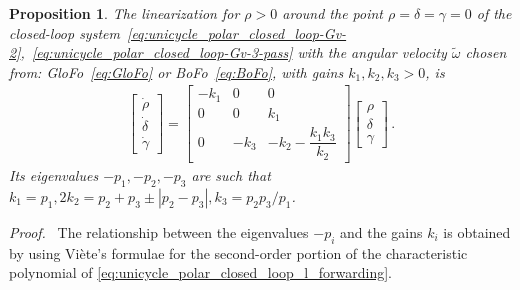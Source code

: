 \documentclass[journal,twoside,web]{ieeecolor}
\theoremstyle{definition}
\newtheorem{proposition}{Proposition}
\newcommand{\abs}[1]{\left\lvert#1\right\rvert}
\renewenvironment{proof}[1][Proof]{\par\pushQED{\qed}\normalfont\textit{#1.}~}{\popQED\par}
\begin{document}
\begin{proposition}\em 
\label{prop:linearization_CLF_forwarding_based}
The linearization for $\rho>0$ around the point $\rho =\delta = \gamma = 0$ of the closed-loop system~\eqref{eq:unicycle_polar_closed_loop-Gv-2},~\eqref{eq:unicycle_polar_closed_loop-Gv-3-pass} with the angular velocity \(\tilde{\omega}\)  chosen from: GloFo~\eqref{eq:GloFo} or BoFo~\eqref{eq:BoFo},
with gains $k_1, k_2, k_3 > 0$, is 
\begin{align}
\label{eq:unicycle_polar_closed_loop_l_forwarding}
\begin{bmatrix}
\dot{\rho}  \\
\dot{\delta} \\ 
\dot{\gamma} 
\end{bmatrix} = 
\begin{bmatrix}
-k_1 &0 &0 \\
0 &0 &k_1 \\
0 &-k_3 &-k_2 - \dfrac{k_1k_3}{k_2}
\end{bmatrix} \begin{bmatrix}
\rho \\ \delta \\ \gamma
\end{bmatrix}  \,.
\end{align}
Its eigenvalues 
$-p_1, -p_2,-p_3$ are such that
$k_1 = p_1 , 
2k_2 = p_2 + p_3 \pm \abs{p_2 - p_3} ,
k_3  = {p_2 p_3}/{p_1}$.  
\end{proposition}

\begin{proof} The relationship between the eigenvalues $-p_i$ and the gains $k_i$ is obtained by using Vi\`{e}te's formulae for the second-order portion of the characteristic polynomial of \eqref{eq:unicycle_polar_closed_loop_l_forwarding}.
\end{proof}

\end{document}
